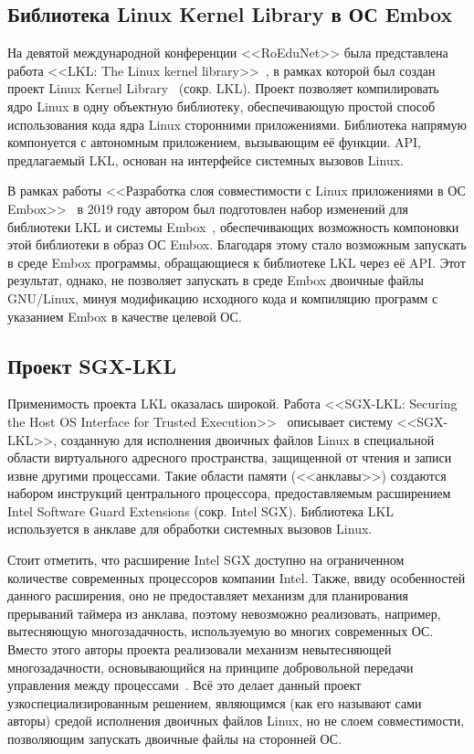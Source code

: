 \subsection{Библиотека Linux Kernel Library в ОС Embox}
На девятой международной конференции <<RoEduNet>> была представлена работа <<LKL: The Linux kernel library>>~\cite{lkl-article}, в рамках которой был создан проект Linux Kernel Library~\cite{lkl} (сокр. LKL). Проект позволяет компилировать ядро Linux в одну объектную библиотеку, обеспечивающую простой способ использования кода ядра Linux сторонними приложениями. Библиотека напрямую компонуется с автономным приложением, вызывающим её функции. API, предлагаемый LKL, основан на интерфейсе системных вызовов Linux.

В рамках работы <<Разработка слоя совместимости с Linux приложениями в ОС Embox>>~\cite{lkl-in-embox-slides} в 2019 году автором был подготовлен набор изменений для библиотеки LKL и системы Embox~\cite{lkl-in-embox-patch}, обеспечивающих возможность компоновки этой библиотеки в образ ОС Embox. Благодаря этому стало возможным запускать в среде Embox программы, обращающиеся к библиотеке LKL через её API. Этот результат, однако, не позволяет запускать в среде Embox двоичные файлы GNU/Linux, минуя модификацию исходного кода и компиляцию программ с указанием Embox в качестве целевой ОС.


\subsection{Проект SGX-LKL}
Применимость проекта LKL оказалась широкой. Работа <<SGX-LKL: Securing the Host OS Interface for Trusted Execution>>~\cite{sgx-lkl} описывает систему <<SGX-LKL>>, созданную для исполнения двоичных файлов Linux в специальной области виртуального адресного пространства, защищенной от чтения и записи извне другими процессами. Такие области памяти (<<анклавы>>) создаются набором инструкций центрального процессора, предоставляемым расширением Intel Software Guard Extensions (сокр. Intel SGX). Библиотека LKL используется в анклаве для обработки системных вызовов Linux.

Стоит отметить, что расширение Intel SGX доступно на ограниченном количестве современных процессоров компании Intel. Также, ввиду особенностей данного расширения, оно не предоставляет механизм для планирования прерываний таймера из анклава, поэтому невозможно реализовать, например, вытесняющую многозадачность, используемую во многих современных ОС. Вместо этого авторы проекта реализовали механизм невытесняющей многозадачности, основывающийся на принципе добровольной передачи управления между процессами~\cite{sgx-threading}. Всё это делает данный проект узкоспециализированным решением, являющимся (как его называют сами авторы) средой исполнения двоичных файлов Linux, но не слоем совместимости, позволяющим запускать двоичные файлы на сторонней ОС.

